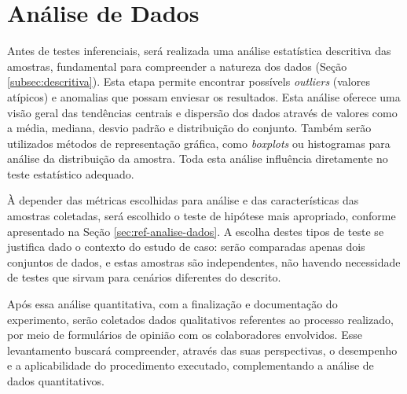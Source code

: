 \section{Análise de Dados}


Antes de testes inferenciais, será realizada uma análise estatística descritiva das amostras, fundamental para compreender a natureza dos dados (Seção \ref{subsec:descritiva}). Esta etapa permite encontrar possívels \textit{outliers} (valores atípicos) e anomalias que possam enviesar os resultados. Esta análise oferece uma visão geral das tendências centrais e dispersão dos dados através de valores como a média, mediana, desvio padrão e distribuição do conjunto. Também serão utilizados métodos de representação gráfica, como \textit{boxplots} ou histogramas para análise da distribuição da amostra. Toda esta análise influência diretamente no teste estatístico adequado.



À depender das métricas escolhidas para análise e das características das amostras coletadas, será escolhido o teste de hipótese mais apropriado, conforme apresentado na Seção \ref{sec:ref-analise-dados}. A escolha destes tipos de teste se justifica dado o contexto do estudo de caso: serão comparadas apenas dois conjuntos de dados, e estas amostras são independentes, não havendo necessidade de testes que sirvam para cenários diferentes do descrito. 

Após essa análise quantitativa, com a finalização e documentação do experimento, serão coletados dados qualitativos referentes ao processo realizado, por meio de formulários de opinião com os colaboradores envolvidos. Esse levantamento buscará compreender, através das suas perspectivas, o desempenho e a aplicabilidade do procedimento executado, complementando a análise de dados quantitativos.
